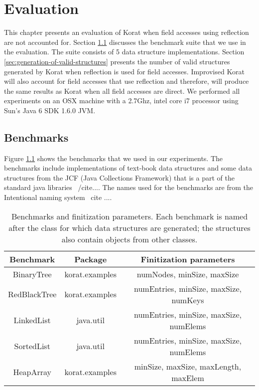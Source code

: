 \chapter{Evaluation}
\label{ch:evaluation}
This chapter presents an evaluation of Korat when field accesses using reflection are not accounted for. Section \ref{sec:benchmarks} discusses the benchmark suite that we use in the evaluation. The suite consists of 5 data structure implementations. Section \ref{sec:generation-of-valid-structures} presents the number of valid structures generated by Korat when reflection is used for field accesses. Improvised Korat will also account for field accesses that use reflection and therefore, will produce the same results as Korat when all field accesses are direct. We performed all experiments on an OSX machine with a  2.7Ghz, intel core i7 processor using Sun’s Java 6 SDK 1.6.0 JVM.

\section{Benchmarks}
\label{sec:benchmarks}
Figure \ref{fig:benchmarksAndFinitizationParams} shows the benchmarks that we used in our experiments. The benchmarks include implementations of text-book data structures and some data structures from the JCF (Java Collections Framework) that is a part of the standard java libraries ~/cite{...}. The names used for the benchmarks are from the Intentional naming system ~cite{
...}.

\begin{table}[h]
\begin{tabular}{|c|c|c|}
\hline
Benchmark    & Package        & Finitization parameters                \\ \hline
BinaryTree   & korat.examples & numNodes, minSize, maxSize             \\ \hline
RedBlackTree & korat.examples & numEntries, minSize, maxSize, numKeys  \\ \hline
LinkedList   & java.util      & numEntries, minSize, maxSize, numElems \\ \hline
SortedList   & java.util      & numEntries, minSize, maxSize, numElems \\ \hline
HeapArray    & korat.examples & minSize, maxSize, maxLength, maxElem   \\ \hline
\end{tabular}
\caption{Benchmarks and finitization parameters. Each benchmark is named after the class for which data structures are generated; the structures also contain objects from other classes.}
\label{fig:benchmarksAndFinitizationParams}
\end{table}

